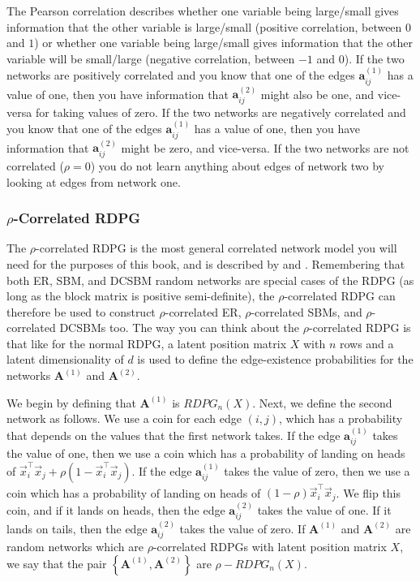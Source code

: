 The Pearson correlation describes whether one variable being large/small gives information that the other variable is large/small (positive correlation, between $0$ and $1$) or whether one variable being large/small gives information that the other variable will be small/large (negative correlation, between $-1$ and $0$). If the two networks are positively correlated and you know that one of the edges $\mathbf a_{ij}^{(1)}$ has a value of one, then you have information that $\mathbf a_{ij}^{(2)}$ might also be one, and vice-versa for taking values of zero. If the two networks are negatively correlated and you know that one of the edges $\mathbf a_{ij}^{(1)}$ has a value of one, then you have information that $\mathbf a_{ij}^{(2)}$ might be zero, and vice-versa. If the two networks are not correlated ($\rho = 0$) you do not learn anything about edges of network two by looking at edges from network one.

\subsubsection{$\rho$-Correlated RDPG}
\label{sec:ch5:multi:corr:rrdpg}

The $\rho$-correlated RDPG is the most general correlated network model you will need for the purposes of this book, and is described by \cite{Lyzinski2014Jan} and \cite{Pantazis2022}. Remembering that both ER, SBM, and DCSBM random networks are special cases of the RDPG (as long as the block matrix is positive semi-definite), the $\rho$-correlated RDPG can therefore be used to construct $\rho$-correlated ER, $\rho$-correlated SBMs, and $\rho$-correlated DCSBMs too. The way you can think about the $\rho$-correlated RDPG is that like for the normal RDPG, a latent position matrix $X$ with $n$ rows and a latent dimensionality of $d$ is used to define the edge-existence probabilities for the networks $\mathbf A^{(1)}$ and $\mathbf A^{(2)}$. 

We begin by defining that $\mathbf A^{(1)}$ is $RDPG_n(X)$. Next, we define the second network as follows. We use a coin for each edge $(i, j)$, which has a probability that depends on the values that the first network takes. If the edge $\mathbf a_{ij}^{(1)}$ takes the value of one, then we use a coin which has a probability of landing on heads of $\vec x_i^\top \vec x_j + \rho(1 - \vec x_i^\top \vec x_j)$. If the edge $\mathbf a_{ij}^{(1)}$ takes the value of zero, then we use a coin which has a probability of landing on heads of $(1 - \rho)\vec x_i^\top \vec x_j$. We flip this coin, and if it lands on heads, then the edge $\mathbf a_{ij}^{(2)}$ takes the value of one. If it lands on tails, then the edge $\mathbf a_{ij}^{(2)}$ takes the value of zero. If $\mathbf A^{(1)}$ and $\mathbf A^{(2)}$ are random networks which are $\rho$-correlated RDPGs with latent position matrix $X$, we say that the pair $\left\{\mathbf A^{(1)}, \mathbf A^{(2)}\right\}$ are $\rho-RDPG_n(X)$. 


